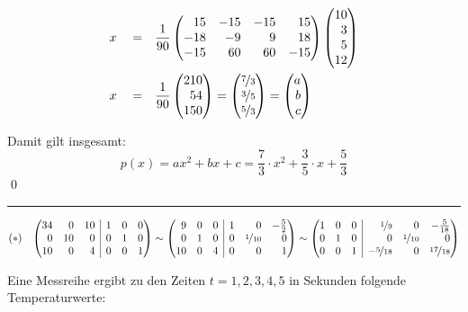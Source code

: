 \documentclass[answers]{exam}
\makeatletter
\newenvironment{sysmatrix}[1]
  {\left(\begin{array}{@{}#1@{}}}
  {\end{array}\right)}
\newcommand{\vektor}[1]{\begin{pmatrix*}[r] #1 \end{pmatrix*}}
\makeatother
\begin{document}
\begin{questions}
\begin{solution}
$$\begin{aligned}
                x \quad = \quad                & \frac{1}{90}\vektor{15        & -15 & -15 & 15 \\ -18 & -9 & 9 & 18 \\ -15 & 60 & 60 & -15} \vektor{10 \\ 3 \\ 5 \\ 12}             \\
                x \quad = \quad                & \frac{1}{90}\vektor{210                        \\ 54 \\ 150} = \vektor{\nicefrac{7}{3} \\ \nicefrac{3}{5} \\ \nicefrac{5}{3}} = \vektor{a \\ b \\ c}
            \end{aligned}
        $$

        Damit gilt insgesamt:
        $$
            p(x) = ax^2 + bx + c = \frac{7}{3} \cdot x^2 + \frac{3}{5} \cdot x + \frac{5}{3}
        $$\qed

        \rule{\textwidth}{0.4pt}
        $$
            (*) \quad
            \begin{sysmatrix}{rrr|rrr}
                34 & 0 & 10 & 1 & 0 & 0  \\
                0 & 10 & 0 & 0 & 1 & 0  \\
                10 & 0 & 4 & 0 & 0 & 1
            \end{sysmatrix}
            \sim
            \begin{sysmatrix}{rrr|rrr}
                9 & 0 & 0 & 1 & 0 & -\frac{5}{2}  \\
                0 & 1 & 0 & 0 & \nicefrac{1}{10} & 0  \\
                10 & 0 & 4 & 0 & 0 & 1
            \end{sysmatrix}
            \sim
            \begin{sysmatrix}{rrr|rrr}
                1 & 0 & 0 & \nicefrac{1}{9} & 0 & -\frac{5}{18}  \\
                0 & 1 & 0 & 0 & \nicefrac{1}{10} & 0  \\
                0 & 0 & 1 & -\nicefrac{5}{18} & 0 & \nicefrac{17}{18}
            \end{sysmatrix}
        $$
    \end{solution}

    \newpage
    \question
    Eine Messreihe ergibt zu den Zeiten $t = 1,2,3,4,5$ in Sekunden folgende Temperaturwerte:


\end{questions}
\end{document}
